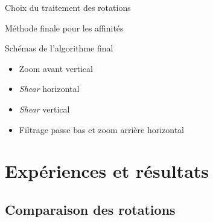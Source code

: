 \documentclass[c,12pt]{beamer}
\begin{document}
\begin{frame}{Choix du traitement des rotations}
\begin{frame}{Méthode finale pour les affinités}
\begin{block}{Schémas de l'algorithme final}

\begin{itemize}
\item Zoom avant vertical
\item \emph{Shear} horizontal
\item \emph{Shear} vertical
\item Filtrage passe bas et zoom arrière horizontal
\end{itemize}

\end{block}

\end{frame}
    
    
    
     
\section{Expériences et résultats}


\subsection{Comparaison des rotations}


\end{frame}
\end{document}

